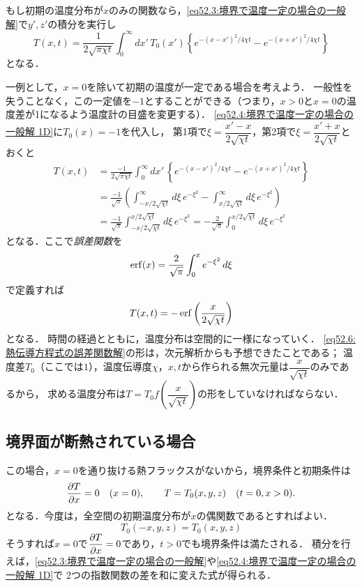 もし初期の温度分布が$x$のみの関数なら，\eqref{eq52.3:境界で温度一定の場合の一般解}で$y',z'$の積分を実行し
\begin{equation}
    T(x,t) = \frac{1}{2\sqrt{\pi\chi t}} \int_{0}^{\infty} dx' \, T_0(x') 
    \left\{ e^{-(x-x')^2/4\chi t} - e^{-(x+x')^2/4\chi t} \right\} 
    \label{eq52.4:境界で温度一定の場合の一般解 1D}
\end{equation}
となる．



一例として，$x=0$を除いて初期の温度が一定である場合を考えよう．
一般性を失うことなく，この一定値を$-1$とすることができる（つまり，$x>0$と$x=0$の温度差が1になるよう温度計の目盛を変更する）．
\eqref{eq52.4:境界で温度一定の場合の一般解 1D}に$T_0(x)=-1$を代入し，
第1項で$\xi = \dfrac{x'-x}{2\sqrt{\chi t}}$，第2項で$\xi = \dfrac{x'+x}{2\sqrt{\chi t}}$とおくと
\begin{align*}
    T(x,t) &= \frac{-1}{2\sqrt{\pi\chi t}} \int_{0}^{\infty} dx' \,
    \left\{ e^{-(x-x')^2/4\chi t} - e^{-(x+x')^2/4\chi t} \right\} \\
    &= \frac{-1}{\sqrt{\pi}} \left( \int_{-x/2\sqrt{\chi t}}^{\infty} d\xi \, e^{-\xi^2} 
    - \int_{x/2\sqrt{\chi t}}^{\infty} d\xi \, e^{-\xi^2} \right)  \\
    &= \frac{-1}{\sqrt{\pi}} \int_{-x/2\sqrt{\chi t}}^{x/2\sqrt{\chi t}} d\xi \, e^{-\xi^2} 
    = -\frac{2}{\sqrt{\pi}} \int_{0}^{x/2\sqrt{\chi t}} d\xi \, e^{-\xi^2}
\end{align*}
となる．ここで\emph{誤差関数}を
\begin{equation}
    \erf(x) = \frac{2}{\sqrt{\pi}} \int_{0}^{x} e^{-\xi^2} \, d\xi
\end{equation}
で定義すれば
\begin{equation}\label{eq52.6:熱伝導方程式の誤差関数解}
    T(x,t) = - \erf \left( \frac{x}{2\sqrt{\chi t}} \right)
\end{equation}
となる．
時間の経過とともに，温度分布は空間的に一様になっていく．
\eqref{eq52.6:熱伝導方程式の誤差関数解}の形は，次元解析からも予想できたことである；
温度差$T_0$（ここでは$1$），温度伝導度$\chi$，$x,t$から作られる無次元量は$\dfrac{x}{\sqrt{\chi t}}$のみであるから，
求める温度分布は$T=T_0 f\left( \dfrac{x}{\sqrt{\chi t}} \right)$の形をしていなければならない．



\subsection*{境界面が断熱されている場合}
この場合，$x=0$を通り抜ける熱フラックスがないから，境界条件と初期条件は
\begin{equation}
    \pdv{T}{x}=0 \quad(x=0), \qquad T=T_0(x,y,z) \quad (t=0, x>0).
\end{equation}
となる．今度は，全空間の初期温度分布が$x$の偶関数であるとすればよい．
\begin{equation}
    T_0(-x,y,z) = T_0(x,y,z)
\end{equation}
そうすれば$x=0$で$\dpdv{T}{x}=0$であり，$t>0$でも境界条件は満たされる．
積分を行えば，\eqref{eq52.3:境界で温度一定の場合の一般解}や\eqref{eq52.4:境界で温度一定の場合の一般解 1D}で
2つの指数関数の差を和に変えた式が得られる．



